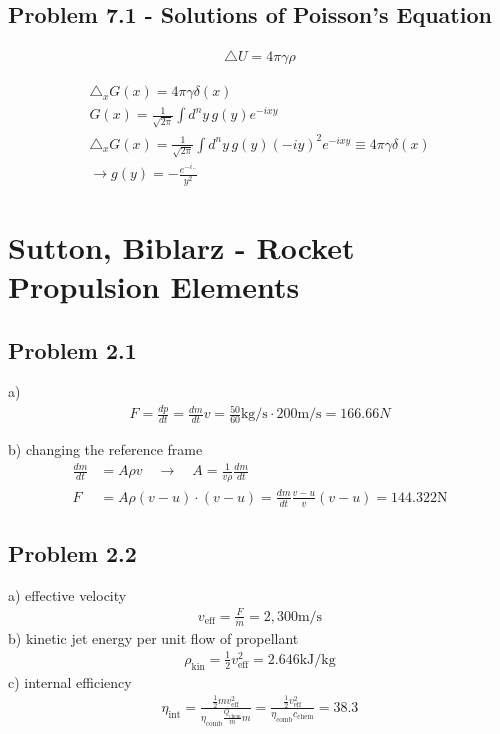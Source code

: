 \documentclass[10pt,a4paper]{book}
\theoremstyle{definition}
\begin{document}
\subsection{Problem 7.1 - Solutions of Poisson's Equation}
\begin{align}
    \triangle U=4\pi \gamma\rho
\end{align}

\begin{align}
    \triangle_x G(x)=4\pi \gamma\delta(x)\\
    G(x)=\frac{1}{\sqrt{2\pi}}\int d^ny\,g(y)e^{-ixy}\\
    \triangle_x G(x)=\frac{1}{\sqrt{2\pi}}\int d^ny\,g(y)(-iy)^2e^{-ixy}\equiv4\pi\gamma\delta(x)\\
    \rightarrow g(y)=-\frac{e^{-i..}}{y^2}
\end{align}

\section{{\sc Sutton, Biblarz} - Rocket Propulsion Elements}
\subsection{Problem 2.1}
a)
\begin{align}
F=\frac{dp}{dt}=\frac{dm}{dt}v=\frac{50}{60}\text{kg/s}\cdot200\text{m/s}=166.66N
\end{align}

b) changing the reference frame
\begin{align}
\frac{dm}{dt}&=A\rho v\quad\rightarrow\quad A=\frac{1}{v\rho}\frac{dm}{dt}\\
F&=A\rho(v-u)\cdot(v-u)=\frac{dm}{dt}\frac{v-u}{v}(v-u)=144.322\text{N}
\end{align}

\subsection{Problem 2.2}
a) effective velocity
\begin{align}
v_\text{eff}=\frac{F}{\dot{m}}=2,300\text{m/s}
\end{align}
b) kinetic jet energy per unit flow of propellant
\begin{align}
\rho_\text{kin}=\frac{1}{2}v_\text{eff}^2=2.646\text{kJ/kg}
\end{align}
c) internal efficiency
\begin{align}
\eta_\text{int}=\frac{\frac{1}{2}mv_\text{eff}^2}{\eta_\text{comb}\frac{Q_\text{chem}}{m}m}=\frac{\frac{1}{2}v_\text{eff}^2}{\eta_\text{comb}c_\text{chem}}=38.3%
\end{align}
\end{document}
